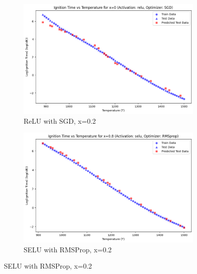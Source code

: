 \documentclass[12pt]{report}
\begin{document}
\begin{figure}[H]
    \centering
    \begin{subfigure}[t]{0.48\textwidth}
        \centering
        \includegraphics[width=\textwidth, keepaspectratio]{relu_sgd_0.png}
        \caption{ReLU with SGD, x=0.2}
    \end{subfigure}
    \hfill
    \begin{subfigure}[t]{0.48\textwidth}
        \centering
        \includegraphics[width=\textwidth, keepaspectratio]{selu_rms_08.png}
        \caption{SELU with RMSProp, x=0.2}
    \end{subfigure}
\end{figure}
\end{document}

